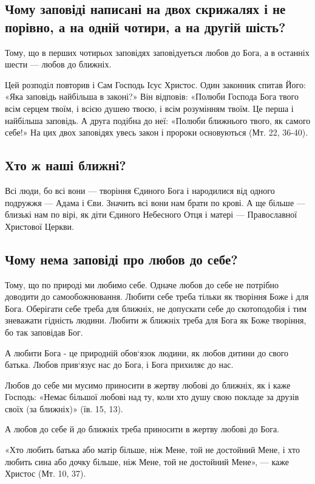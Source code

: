 \documentclass[main.tex]{subfiles}
\begin{document}
\subsection{Чому заповіді написані на двох скрижалях і не порівно, а на одній чотири, а на другій шість?}

Тому, що в перших чотирьох заповідях заповідуеться любов до Бога, а в останніх шести — любов до ближніх.

Цей розподіл повторив і Сам Господь Ісус Христос. Один законник спитав Його: «Яка заповідь найбільша в законі?» Він відповів: «Полюби Господа Бога твого всім серцем твоїм, і всією душею твоєю, і всім розумінням твоїм. Це перша і найбільша заповідь. А друга подібна до неї: «Полюби ближнього твого, як самого себе!» На цих двох заповідях увесь закон і пророки основуються (Мт. 22, 36-40).

\subsection{Хто ж наші ближні?}

Всі люди, бо всі вони — творіння Єдиного Бога і народилися від одного подружжя — Адама і Єви. Значить всі вони нам брати по крові. А ще більше — близькі нам по вірі, як діти Єдиного Небесного Отця і матері — Православної Христової Церкви.

\subsection{Чому нема заповіді про любов до себе?}

Тому, що по природі ми любимо себе. Одначе любов до себе не потрібно доводити до самообожнювання. Любити себе треба тільки як творіння Боже і для Бога. Оберігати себе треба для ближніх, не допускати себе до скотоподобія і тим зневажати гідність людини. Любити ж ближніх треба для Бога як Боже творіння, бо так заповідав Бог.

А любити Бога - це природній обов`язок людини, як любов дитини до свого батька. Любов прив`язує нас до Бога, і Бога прихиляє до нас.

Любов до себе ми мусимо приносити в жертву любові до ближніх, як і каже Господь: «Немає більшої любові над ту, коли хто душу свою покладе за друзів своїх (за ближніх)» (їв. 15, 13).

А любов до себе й до ближніх треба приносити в жертву любові до Бога.

«Хто любить батька або матір більше, ніж Мене, той не достойний Мене, і хто любить сина або дочку більше, ніж Мене, той не достойний Мене», — каже Христос (Мт. 10, 37).
\end{document}
